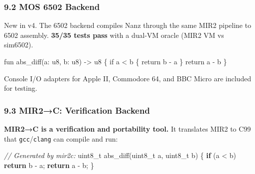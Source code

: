 \documentclass[
  11pt,
]{article}
\newenvironment{Shaded}{}{}
\newcommand{\BaseNTok}[1]{\textcolor[rgb]{0.25,0.63,0.44}{#1}}
\newcommand{\BuiltInTok}[1]{\textcolor[rgb]{0.00,0.50,0.00}{#1}}
\newcommand{\CommentTok}[1]{\textcolor[rgb]{0.38,0.63,0.69}{\textit{#1}}}
\newcommand{\ControlFlowTok}[1]{\textcolor[rgb]{0.00,0.44,0.13}{\textbf{#1}}}
\newcommand{\DataTypeTok}[1]{\textcolor[rgb]{0.56,0.13,0.00}{#1}}
\newcommand{\FunctionTok}[1]{\textcolor[rgb]{0.02,0.16,0.49}{#1}}
\newcommand{\NormalTok}[1]{#1}
\newcommand{\OperatorTok}[1]{\textcolor[rgb]{0.40,0.40,0.40}{#1}}
\begin{document}
\subsubsection{9.2 MOS 6502 Backend}\label{mos-6502-backend}

New in v4. The 6502 backend compiles Nanz through the same MIR2 pipeline
to 6502 assembly. \textbf{35/35 tests pass} with a dual-VM oracle (MIR2
VM vs sim6502).

\begin{Shaded}
\begin{Highlighting}[]
\NormalTok{fun abs\_diff(a: u8, b: u8) {-}\textgreater{} u8 \{}
\NormalTok{    if a \textless{} b \{ return b {-} a \}}
\NormalTok{    return a {-} b}
\NormalTok{\}}
\end{Highlighting}
\end{Shaded}

\begin{Shaded}
\end{Shaded}

Console I/O adapters for Apple II, Commodore 64, and BBC Micro are
included for testing.

\subsubsection{9.3 MIR2→C: Verification
Backend}\label{mir2c-verification-backend}

\textbf{MIR2→C is a verification and portability tool.} It translates
MIR2 to C99 that \texttt{gcc}/\texttt{clang} can compile and run:

\begin{Shaded}
\begin{Highlighting}[]
\CommentTok{// Generated by mir2c:}
\DataTypeTok{uint8\_t}\NormalTok{ abs\_diff}\OperatorTok{(}\DataTypeTok{uint8\_t}\NormalTok{ a}\OperatorTok{,} \DataTypeTok{uint8\_t}\NormalTok{ b}\OperatorTok{)} \OperatorTok{\{}
    \ControlFlowTok{if} \OperatorTok{(}\NormalTok{a }\OperatorTok{\textless{}}\NormalTok{ b}\OperatorTok{)} \ControlFlowTok{return}\NormalTok{ b }\OperatorTok{{-}}\NormalTok{ a}\OperatorTok{;}
    \ControlFlowTok{return}\NormalTok{ a }\OperatorTok{{-}}\NormalTok{ b}\OperatorTok{;}
\OperatorTok{\}}
\end{Highlighting}
\end{Shaded}
\end{document}

